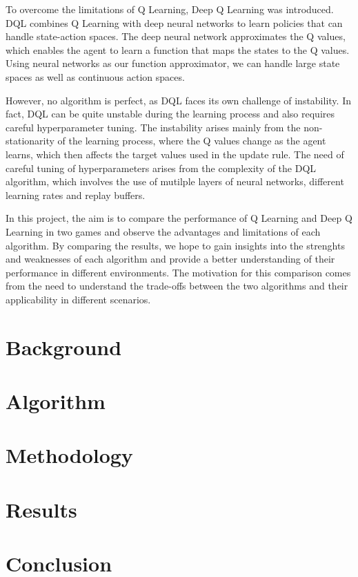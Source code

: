\documentclass{article}
\begin{document}
To overcome the limitations of Q Learning, Deep Q Learning was introduced. DQL
combines Q Learning with deep neural networks to learn policies that can handle
state-action spaces. The deep neural network approximates the Q values, which
enables the agent to learn a function that maps the states to the Q values.
Using neural networks as our function approximator, we can handle large state
spaces as well as continuous action spaces.

However, no algorithm is perfect, as DQL faces its own challenge of
instability. In fact, DQL can be quite unstable during the learning process and
also requires careful hyperparameter tuning. The instability arises mainly from
the non-stationarity of the learning process, where the Q values change as the
agent learns, which then affects the target values used in the update rule. The
need of careful tuning of hyperparameters arises from the complexity of the DQL
algorithm, which involves the use of mutilple layers of neural networks,
different learning rates and replay buffers.

In this project, the aim is to compare the performance of Q Learning and Deep Q
Learning in two games and observe the advantages and limitations of each
algorithm. By comparing the results, we hope to gain insights into the
strenghts and weaknesses of each algorithm and provide a better understanding
of their performance in different environments. The motivation for this
comparison comes from the need to understand the trade-offs between the two
algorithms and their applicability in different scenarios.

\section{Background}

\section{Algorithm}

\section{Methodology}

\section{Results}

\section{Conclusion}
\end{document}
